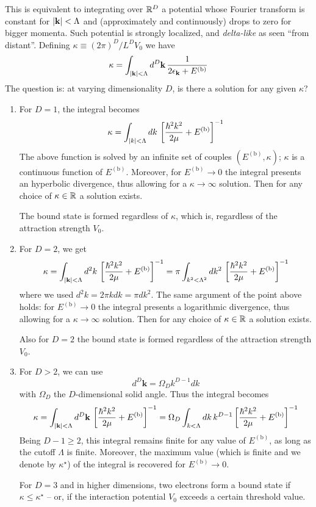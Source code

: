 This is equivalent to integrating over $\mathbb{R}^D$ a potential whose Fourier transform is constant for $\abs{\mathbf{k}} < \Lambda$ and (approximately and continuously) drops to zero for bigger momenta. Such potential is strongly localized, and \textit{delta-like} as seen ``from distant''. Defining $\kappa \equiv (2\pi)^D/ L^D V_0$ we have
\[
	\kappa = \int_{\abs{\mathbf{k}}<\Lambda} d^D \mathbf{k} \, \frac{1}{2\epsilon_\mathbf{k} + E^{(\mathrm{b})}}
\]
The question is: at varying dimensionality $D$, is there a solution for any given $\kappa$?

\begin{enumerate}
	\item For $D=1$, the integral becomes
	\[
		\kappa = \int_{\abs{k}<\Lambda} dk \, \left[{\frac{\hbar^2 k^2}{2\mu} + E^{(\mathrm{b})}}\right]^{-1}
	\]
	The above function is solved by an infinite set of couples $(E^{(\mathrm{b})},\kappa)$; $\kappa$ is a continuous function of $E^{(\mathrm{b})}$. Moreover, for $E^{(\mathrm{b})} \to 0$ the integral presents an hyperbolic divergence, thus allowing for a $\kappa\to\infty$ solution. Then for any choice of $\kappa\in\mathbb{R}$ a solution exists. 
	
	The bound state is formed regardless of $\kappa$, which is, regardless of the attraction strength $V_0$.
	\item For $D=2$, we get
	\[
		\kappa = \int_{\abs{\mathbf{k}}<\Lambda} d^2 k \, \left[{\frac{\hbar^2 k^2}{2\mu} + E^{(\mathrm{b})}}\right]^{-1} = \pi \int_{k^2 < \Lambda^2} d k^2 \, \left[{\frac{\hbar^2 k^2}{2\mu} + E^{(\mathrm{b})}}\right]^{-1}
	\]
	where we used $d^2 k = 2\pi k dk = \pi dk^2$. The same argument of the point above holds: for $E^{(\mathrm{b})} \to 0$ the integral presents a logarithmic divergence, thus allowing for a $\kappa\to\infty$ solution. Then for any choice of $\kappa\in\mathbb{R}$ a solution exists.
	
	Also for $D=2$ the bound state is formed regardless of the attraction strength $V_0$.
	
	\item For $D>2$, we can use
	\[
		d^D \mathbf{k} = \Omega_D k^{D-1} dk
	\]
	with $\Omega_D$ the $D$-dimensional solid angle. Thus the integral becomes
	\[
		\kappa = \int_{\abs{\mathbf{k}}<\Lambda} d^D \mathbf{k} \, \left[{\frac{\hbar^2 k^2}{2\mu} + E^{(\mathrm{b})}}\right]^{-1} = \Omega_D \int_{k<\Lambda} dk \, k^{D-1} \left[{\frac{\hbar^2 k^2}{2\mu} + E^{(\mathrm{b})}}\right]^{-1} 
	\]
	Being $D-1 \ge 2$, this integral remains finite for any value of $E^{(\mathrm{b})}$, as long as the cutoff $\Lambda$ is finite. Moreover, the maximum value (which is finite and we denote by $\kappa^\star$) of the integral is recovered for $E^{(\mathrm{b})} \to 0$.
	
	For $D=3$ and in higher dimensions, two electrons form a bound state if $\kappa \le \kappa^\star$ -- or, if the interaction potential $V_0$ exceeds a certain threshold value.
\end{enumerate}

